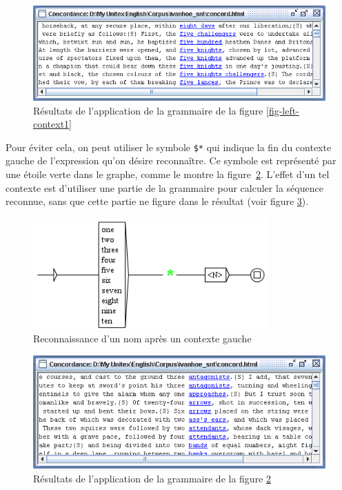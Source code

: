 \begin{figure}[!ht]
\begin{center}
\includegraphics[width=14cm]{resources/img/fig6-17b.png}
\caption{Résultats de l'application de la grammaire de la figure
\ref{fig-left-context1}\label{fig-left-context2}}
\end{center}
\end{figure}

\bigskip
\noindent Pour éviter cela, on peut utiliser le symbole \verb+$*+ qui indique la fin du contexte
gauche de l'expression qu'on désire reconnaître. Ce symbole est représenté par une étoile verte
dans le graphe, comme le montre la figure~\ref{fig-left-context3}. L'effet d'un tel contexte est
d'utiliser une partie de la grammaire pour calculer la séquence reconnue, sans que cette partie ne figure dans le résultat (voir figure \ref{fig-left-context4}).

\begin{figure}[!ht]
\begin{center}
\includegraphics[width=9cm]{resources/img/fig6-17c.png}
\caption{Reconnaissance d'un nom après un contexte gauche\label{fig-left-context3}}
\end{center}
\end{figure}

\begin{figure}[!ht]
\begin{center}
\includegraphics[width=14cm]{resources/img/fig6-17d.png}
\caption{Résultats de l'application de la grammaire de la figure
\ref{fig-left-context3}\label{fig-left-context4}}
\end{center}
\end{figure}

